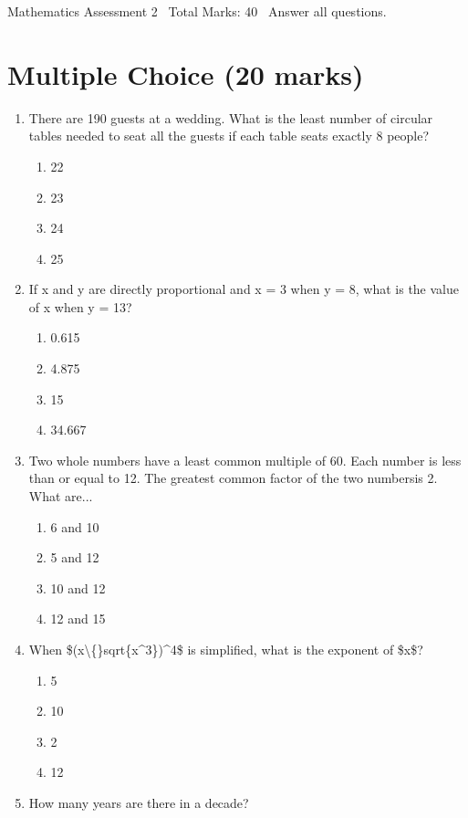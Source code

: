 \documentclass[12pt]{article}
\begin{document}
\begin{center}
Mathematics Assessment 2 \
Total Marks: 40 \
Answer all questions.
\end{center}

\section*{Multiple Choice (20 marks)}
\begin{enumerate}[label=\arabic*.]
\item There are 190 guests at a wedding. What is the least number of circular tables needed to seat all the guests if each table seats exactly 8 people?
\begin{enumerate}[label=(\alph*)]
    \item 22
    \item 23
    \item 24
    \item 25
\end{enumerate}
\item If x and y are directly proportional and x = 3 when y = 8, what is the value of x when y = 13?
\begin{enumerate}[label=(\alph*)]
    \item 0.615
    \item 4.875
    \item 15
    \item 34.667
\end{enumerate}
\item Two whole numbers have a least common multiple of 60. Each number is less than or equal to 12. The greatest common factor of the two numbersis 2. What are...
\begin{enumerate}[label=(\alph*)]
    \item 6 and 10
    \item 5 and 12
    \item 10 and 12
    \item 12 and 15
\end{enumerate}
\item When \$(x\textbackslash\{\}sqrt\{x\^{}3\})\^{}4\$ is simplified, what is the exponent of \$x\$?
\begin{enumerate}[label=(\alph*)]
    \item 5
    \item 10
    \item 2
    \item 12
\end{enumerate}
\item How many years are there in a decade?

\end{enumerate}
\end{document}
